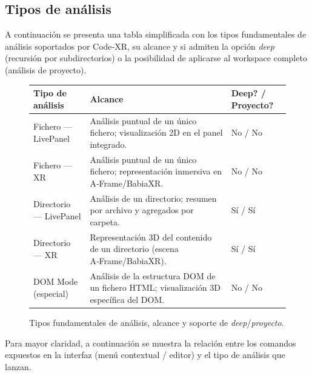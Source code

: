 \documentclass[a4paper, 12pt]{book}
\begin{document}
\subsection{Tipos de análisis}
\label{sec:tipos-analisis}

A continuación se presenta una tabla simplificada con los tipos fundamentales de análisis soportados por Code‑XR, su alcance y si admiten la opción \emph{deep} (recursión por subdirectorios) o la posibilidad de aplicarse al workspace completo (análisis de proyecto).

\begin{figure}[H]
\centering\small
\begin{tabular}{p{5.0cm} p{7.5cm} p{2.5cm}}
\hline
\textbf{Tipo de análisis} & \textbf{Alcance} & \textbf{Deep? / Proyecto?} \\
\hline
Fichero — LivePanel & Análisis puntual de un único fichero; visualización 2D en el panel integrado. & No / No \\
Fichero — XR & Análisis puntual de un único fichero; representación inmersiva en A‑Frame/BabiaXR. & No / No \\
Directorio — LivePanel & Análisis de un directorio; resumen por archivo y agregados por carpeta. & Sí / Sí \\
Directorio — XR & Representación 3D del contenido de un directorio (escena A‑Frame/BabiaXR). & Sí / Sí \\
DOM Mode (especial) & Análisis de la estructura DOM de un fichero HTML; visualización 3D específica del DOM. & No / No \\
\hline
\end{tabular}
\caption{Tipos fundamentales de análisis, alcance y soporte de \emph{deep}/\emph{proyecto}.}
\label{tab:tipos-analisis}
\end{figure}

\bigskip

\noindent Para mayor claridad, a continuación se muestra la relación entre los comandos expuestos en la interfaz (menú contextual / editor) y el tipo de análisis que lanzan.
\end{document}
